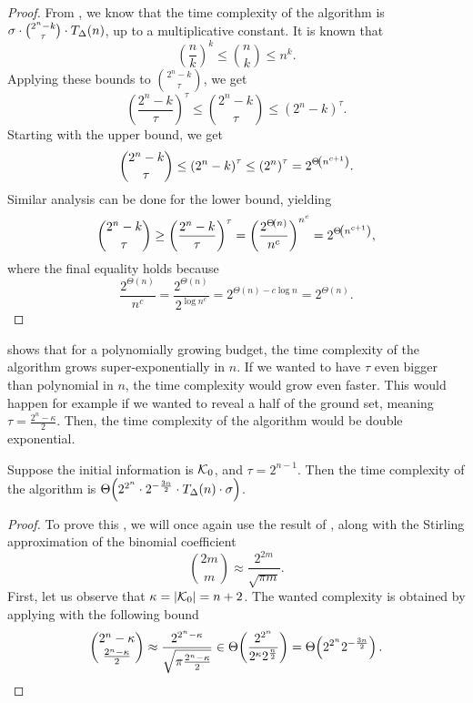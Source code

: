 \begin{proof}
  From , we know that the time complexity of the \algFO{} algorithm is $ \sigma \cdot \binom{2^n-k}{\tau} \cdot T_\Delta\!\left(n\right) $, up to a multiplicative constant.
  It is known that \[
    \left( \frac{n}{k} \right)^k \leq \binom nk \leq n^k.
  \]
  Applying these bounds to $ \binom{2^n-k}\tau $, we get \[
    \left( \frac{2^n-k}{\tau} \right)^\tau \leq \binom{2^n-k}\tau \leq \left( 2^n-k \right)^\tau.
  \]
  Starting with the upper bound, we get \begin{align*}
    \binom{2^n-k}\tau \leq \left( 2^n-k \right)^\tau \leq \left( 2^n \right)^\tau = 2^{\Theta\!\left(n^{c+1}\right)}.
  \end{align*}
  Similar analysis can be done for the lower bound, yielding
  \begin{align*}
    \binom{2^n-k}\tau \geq \left( \frac{2^n-k}{\tau} \right)^\tau = \left( \frac{2^{\Theta\!\left(n\right)}}{n^c} \right)^{n^c} = 2^{\Theta\!\left(n^{c+1}\right)},
  \end{align*}
  where the final equality holds because \[
      \frac{2^{\Theta(n)}}{n^c} = \frac{2^{\Theta(n)}}{2^{\log n^c}} = 2^{\Theta(n) - c \log n} = 2^{\Theta(n)}.
  \]
\end{proof}

 shows that for a polynomially growing budget, the time complexity of the \algFO{} algorithm grows super-exponentially in $ n $.
If we wanted to have $ \tau $ even bigger than polynomial in $ n $, the time complexity would grow even faster.
This would happen for example if we wanted to reveal a half of the ground set, meaning $ \tau = \frac{2^n - \kappa}{2} $.
Then, the time complexity of the \algFO{} algorithm would be double exponential.

\begin{prop}[ ]
  \label{thm:algfo-time-complexity-double-exp}
  Suppose the initial information is $ \mathcal{K}_0 $, and $ \tau = 2^{n-1} $.
  Then the time complexity of the \algFO{} algorithm is $ \Theta\!\left(2^{2^n} \cdot 2^{-\frac{3n}{2}} \cdot T_\Delta\!\left(n\right) \cdot \sigma\right) $.
\end{prop}

\begin{proof}
  To prove this , we will once again use the result of , along with the Stirling approximation of the binomial coefficient \[
    \binom {2m}m \approx \frac{2^{2m}}{\sqrt{\pi m}}.
  \]
  First, let us observe that $ \kappa = \left\lvert \mathcal{K}_0 \right\rvert = n + 2 $.
  The wanted complexity is obtained by applying  with the following bound \[
    \binom{2^{n}-\kappa}{\frac{2^n - \kappa}{2}} \approx \frac{2^{2^n - \kappa}}{\sqrt{\pi \frac{2^n - \kappa}{2}}} \in \Theta\!\left(\frac{2^{2^n}}{2^\kappa 2^{\frac n2}}\right) = \Theta\!\left(2^{2^n} 2^{-\frac{3n}{2}}\right).
  \]
\end{proof}

